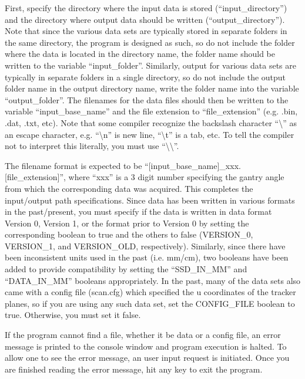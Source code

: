 \documentclass{article}
\begin{document}
First, specify the directory where the input data is stored (``input\_directory'') and the directory where output data should be written (``output\_directory'').  Note that since the various data sets are typically stored in separate folders in the same directory, the program is designed as such, so do not include the folder where the data is located in the directory name, the folder name should be written to the variable ``input\_folder''.  Similarly, output for various data sets are typically in separate folders in a single directory, so do not include the output folder name in the output directory name, write the folder name into the variable ``output\_folder''.  The filenames for the data files should then be written to the variable ``input\_base\_name'' and the file extension to ``file\_extension'' (e.g. .bin, .dat, .txt, etc).  Note that some compiler recognize the backslash character ``\textbackslash'' as an escape character, e.g. ``\textbackslash n'' is new line, ``\textbackslash t'' is a tab, etc.  To tell the compiler not
to interpret this literally, you must use ``\textbackslash\textbackslash''.

The filename format is expected to be ``[input\_base\_name]\_xxx.[file\_extension]'', where ``xxx'' is a 3 digit number specifying the gantry angle from which the corresponding data was acquired.  This completes the input/output path specifications.  Since data has been written in various formats in the past/present, you must specify if the data is written in data format Version 0, Version 1, or the format prior to Version 0 by setting the corresponding boolean to true and the others to false (VERSION\_0, VERSION\_1, and VERSION\_OLD, respectively).  Similarly, since there have been inconsistent units used in the past (i.e. mm/cm), two booleans have been added to provide compatibility by setting the ``SSD\_IN\_MM'' and ``DATA\_IN\_MM'' booleans appropriately.  In the past, many of the data sets also came with a config file (scan.cfg) which specified the u coordinates of the tracker planes, so if you are using any such data set, set the CONFIG\_FILE boolean to true.  Otherwise, you must set it false.

If the program cannot find a file, whether it be data or a config file, an error message is printed to the console window and program execution is halted.  To allow one to see the error message, an user input request is initiated.  Once you are finished reading the error message, hit any key to exit the program.
\end{document}
